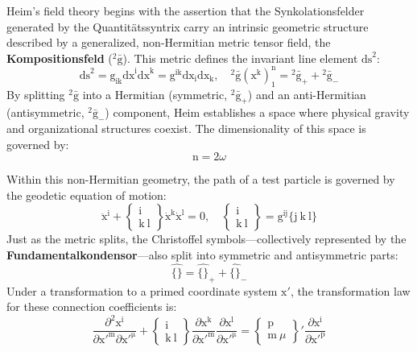 \documentclass[12pt]{article}
\begin{document}
Heim’s field theory begins with the assertion that the Synkolationsfelder generated by the Quantitätssyntrix carry an intrinsic geometric structure described by a generalized, non-Hermitian metric tensor field, the \textbf{Kompositionsfeld} (${}^2\bar{\mathrm{g}}$). This metric defines the invariant line element $\mathrm{ds}^2$:
\begin{equation}
\mathrm{ds}^2 = \mathrm{g}_{\mathrm{ik}} \mathrm{dx}^\mathrm{i} \mathrm{dx}^\mathrm{k} = \mathrm{g}^{\mathrm{ik}} \mathrm{dx}_\mathrm{i} \mathrm{dx}_\mathrm{k}, \quad {}^2\bar{\mathrm{g}}(\mathrm{x^k})_1^\mathrm{n} = {}^2\bar{\mathrm{g}}_+ + {}^2\bar{\mathrm{g}}_- \tag{37}
\label{eq:field_metric_splitting}
\end{equation}
By splitting ${}^2\bar{\mathrm{g}}$ into a Hermitian (symmetric, ${}^2\bar{\mathrm{g}}_+$) and an anti-Hermitian (antisymmetric, ${}^2\bar{\mathrm{g}}_-$) component, Heim establishes a space where physical gravity and organizational structures coexist. The dimensionality of this space is governed by:
\begin{equation}
\mathrm{n} = 2\omega \tag{38}
\end{equation}

Within this non-Hermitian geometry, the path of a test particle is governed by the geodetic equation of motion:
\begin{equation}
\ddot{\mathrm{x}}^\mathrm{i} + \left\{ \begin{smallmatrix} \mathrm{i} \\ \mathrm{k} \ \mathrm{l} \end{smallmatrix} \right\} \dot{\mathrm{x}}^\mathrm{k} \dot{\mathrm{x}}^\mathrm{l} = 0, \quad \left\{ \begin{smallmatrix} \mathrm{i} \\ \mathrm{k} \ \mathrm{l} \end{smallmatrix} \right\} = \mathrm{g}^{\mathrm{ij}} \{ \mathrm{j} \ \mathrm{k} \ \mathrm{l} \} \tag{39}
\end{equation}
Just as the metric splits, the Christoffel symbols—collectively represented by the \textbf{Fundamentalkondensor}—also split into symmetric and antisymmetric parts:
\begin{equation}
\widehat{\{\}} = \widehat{\{\}}_+ + \widehat{\{\}}_- \tag{39a}
\end{equation}
Under a transformation to a primed coordinate system $\mathrm{x}'$, the transformation law for these connection coefficients is:
\begin{equation}
\frac{\partial^2 \mathrm{x^i}}{\partial \mathrm{x'^m} \partial \mathrm{x'^\mu}} + \left\{ \begin{smallmatrix} \mathrm{i} \\ \mathrm{k} \ \mathrm{l} \end{smallmatrix} \right\} \frac{\partial \mathrm{x^k}}{\partial \mathrm{x'^m}} \frac{\partial \mathrm{x^l}}{\partial \mathrm{x'^\mu}} = \left\{ \begin{smallmatrix} \mathrm{p} \\ \mathrm{m} \ \mu \end{smallmatrix} \right\}' \frac{\partial \mathrm{x^i}}{\partial \mathrm{x'^p}} \tag{40}
\end{equation}
\end{document}
